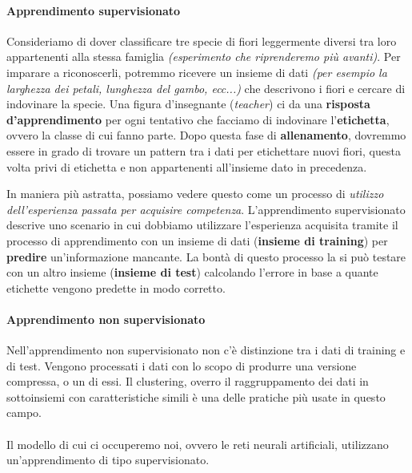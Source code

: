 \documentclass[12pt, twoside, letterpaper]{report}
\begin{document}
				\paragraph{Apprendimento supervisionato} Consideriamo di dover classificare tre specie di fiori leggermente diversi tra loro appartenenti alla stessa famiglia \textit{(esperimento che riprenderemo più avanti)}. Per imparare a riconoscerli, potremmo ricevere un insieme di dati \textit{(per esempio la larghezza dei petali, lunghezza del gambo, ecc...)} che descrivono i fiori e cercare di indovinare la specie. Una figura d'insegnante (\textit{teacher}) ci da una \textbf{risposta d'apprendimento} per ogni tentativo che facciamo di indovinare l'\textbf{etichetta}, ovvero la classe di cui fanno parte. Dopo questa fase di \textbf{allenamento}, dovremmo essere in grado di trovare un pattern tra i dati per etichettare nuovi fiori, questa volta privi di etichetta e non appartenenti all'insieme dato in precedenza. 
										
					In maniera più astratta, possiamo vedere questo come un processo di \textit{utilizzo dell'esperienza passata per acquisire competenza}. L'apprendimento supervisionato descrive uno scenario in cui dobbiamo utilizzare l'esperienza acquisita tramite il processo di apprendimento con un insieme di dati (\textbf{insieme di training}) per \textbf{predire} un'informazione mancante. La bontà di questo processo la si può testare con un altro insieme (\textbf{insieme di test}) calcolando l'errore in base a quante etichette vengono predette in modo corretto. 
				
				\paragraph{Apprendimento non supervisionato}  Nell'apprendimento non supervisionato non c'è distinzione tra i dati di training e di test. Vengono processati i dati con lo scopo di produrre una versione compressa, o un  di essi. Il clustering, overro il raggruppamento dei dati in sottoinsiemi con caratteristiche simili è una delle pratiche più usate in questo campo.\\\\
				Il modello di cui ci occuperemo noi, ovvero le reti neurali artificiali, utilizzano un'apprendimento di tipo supervisionato.
				
				
\end{document}
